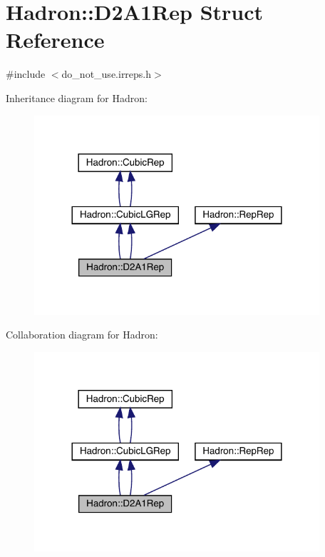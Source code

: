 \hypertarget{structHadron_1_1D2A1Rep}{}\section{Hadron\+:\+:D2\+A1\+Rep Struct Reference}
\label{structHadron_1_1D2A1Rep}


{\ttfamily \#include $<$do\+\_\+not\+\_\+use.\+irreps.\+h$>$}



Inheritance diagram for Hadron\+:\nopagebreak
\begin{figure}[H]
\begin{center}
\leavevmode
\includegraphics[width=300pt]{dd/de6/structHadron_1_1D2A1Rep__inherit__graph}
\end{center}
\end{figure}


Collaboration diagram for Hadron\+:\nopagebreak
\begin{figure}[H]
\begin{center}
\leavevmode
\includegraphics[width=300pt]{d9/da3/structHadron_1_1D2A1Rep__coll__graph}
\end{center}
\end{figure}
